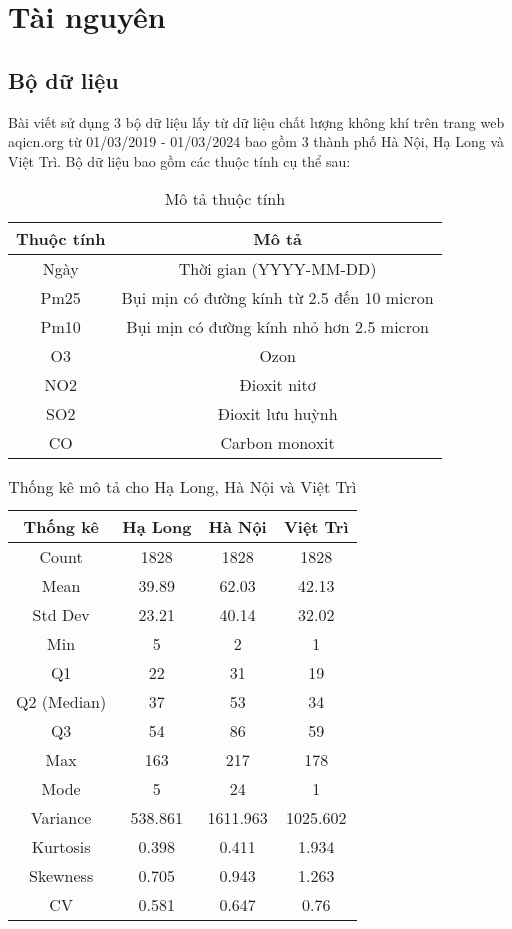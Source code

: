 \section{Tài nguyên}

\subsection{Bộ dữ liệu}
Bài viết sử dụng 3 bộ dữ liệu lấy từ dữ liệu chất lượng không khí trên trang web aqicn.org từ 01/03/2019 - 01/03/2024 bao gồm 3 thành phố Hà Nội, Hạ Long và Việt Trì. Bộ dữ liệu bao gồm các thuộc tính cụ thể sau:
\begin{table}[h]
  \centering
  \caption{Mô tả thuộc tính}
  \begin{tabular}{|c|c|}
    \hline
    \textbf{Thuộc tính} & \textbf{Mô tả} \\ \hline
    Ngày & Thời gian (YYYY-MM-DD) \\ \hline
    Pm25 & Bụi mịn có đường kính từ 2.5 đến 10 micron \\ \hline
    Pm10 & Bụi mịn có đường kính nhỏ hơn 2.5 micron \\ \hline
    O3 & Ozon \\ \hline
    NO2 & Đioxit nitơ \\ \hline
    SO2 & Đioxit lưu huỳnh \\ \hline
    CO & Carbon monoxit \\ \hline
  \end{tabular}
\end{table}

\begin{table}[h!]
\centering
\caption{Thống kê mô tả cho Hạ Long, Hà Nội và Việt Trì}
\label{tab:stats}
\begin{tabular}{|c|c|c|c|}
\hline
\textbf{Thống kê} & \textbf{Hạ Long} & \textbf{Hà Nội} & \textbf{Việt Trì} \\
\hline
Count & 1828 & 1828 & 1828 \\
Mean & 39.89 & 62.03 & 42.13 \\
Std Dev & 23.21 & 40.14 & 32.02 \\
Min & 5 & 2 & 1 \\
Q1 & 22 & 31 & 19 \\
Q2 (Median) & 37 & 53 & 34 \\
Q3 & 54 & 86 & 59 \\
Max & 163 & 217 & 178 \\
Mode & 5 & 24 & 1 \\
Variance & 538.861 & 1611.963 & 1025.602 \\
Kurtosis & 0.398 & 0.411 & 1.934 \\
Skewness & 0.705 & 0.943 & 1.263 \\
CV & 0.581 & 0.647 & 0.76 \\
\hline
\end{tabular}
\end{table}

